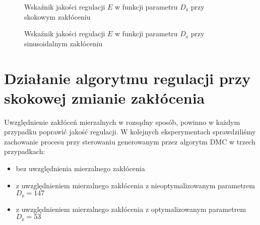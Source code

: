 \begin{figure}[t]
    \centering
    \caption{Wskaźnik jakości regulacji $E$ w funkcji parametru $D_{\mathrm{z}}$ przy skokowym zakłóceniu}
    \label{zad5_dz_skok_wynik}
\end{figure}

\begin{figure}[b]
    \centering
    \caption{Wskaźnik jakości regulacji $E$ w funkcji parametru $D_{\mathrm{z}}$ przy sinusoidalnym zakłóceniu}
    \label{zad5_dz_sin_wynik}
\end{figure}
\FloatBarrier

\section{Działanie algorytmu regulacji przy skokowej zmianie zakłócenia}
Uwzględnienie zakłóceń mierzalnych w rozsądny sposób, powinno w każdym przypadku 
poprawić jakość regulacji. W kolejnych eksperymentach sprawdziliśmy zachowanie procesu
przy sterowaniu generowanym przez algorytm DMC w trzech przypadkach:

\begin{itemize}
    \item bez uwzględnienia mierzalnego zakłócenia
    \item z uwzględnieniem mierzalnego zakłócenia z nieoptymalizowanym parametrem $D_{\mathrm{z}} = \num{147}$
    \item z uwzględnieniem mierzalnego zakłócenia z optymalizowanym parametrem $D_{\mathrm{z}} = \num{53}$
\end{itemize}

